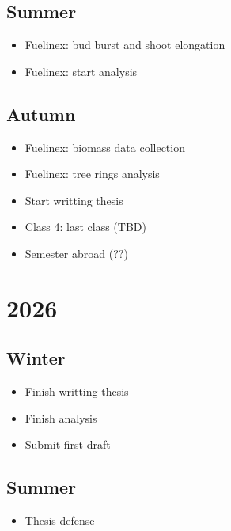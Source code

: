 \documentclass{article}
\begin{document}
\subsection {Summer}
\begin {itemize}
	\item Fuelinex: bud burst and shoot elongation
	\item Fuelinex: start analysis
\end {itemize}

\subsection {Autumn}
\begin {itemize}
	\item Fuelinex: biomass data collection
	\item Fuelinex: tree rings analysis 
	\item Start writting thesis 
	\item Class 4: last class (TBD)
	\item Semester abroad (??)
\end {itemize}

\section {2026}
\subsection {Winter}
\begin {itemize}
	\item Finish writting thesis
	\item Finish analysis
	\item Submit first draft
\end {itemize}

\subsection {Summer}
\begin {itemize}
	\item Thesis defense
\end {itemize}


\end{document}
